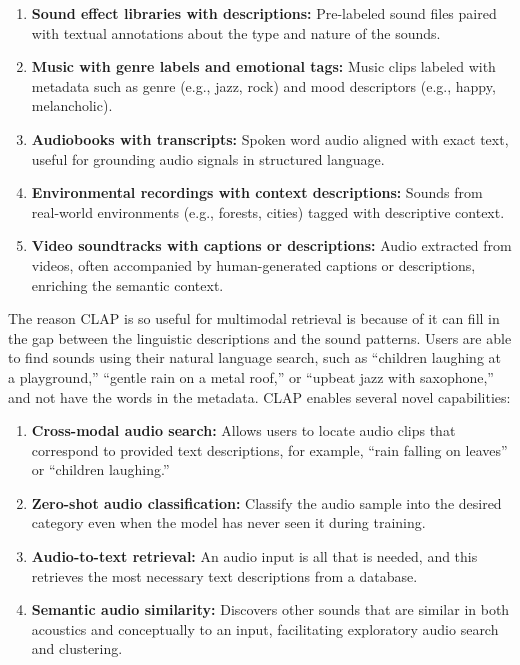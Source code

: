 \documentclass[conference]{IEEEtran}
\begin{document}
\begin{enumerate}
\begin{enumerate}
    \item \textbf{Sound effect libraries with descriptions:} Pre-labeled sound files paired with textual annotations about the type and nature of the sounds.
    
    \item \textbf{Music with genre labels and emotional tags:} Music clips labeled with metadata such as genre (e.g., jazz, rock) and mood descriptors (e.g., happy, melancholic).
    
    \item \textbf{Audiobooks with transcripts:} Spoken word audio aligned with exact text, useful for grounding audio signals in structured language.
    
    \item \textbf{Environmental recordings with context descriptions:} Sounds from real-world environments (e.g., forests, cities) tagged with descriptive context.
    
    \item \textbf{Video soundtracks with captions or descriptions:} Audio extracted from videos, often accompanied by human-generated captions or descriptions, enriching the semantic context.
\end{enumerate}

The reason CLAP is so useful for multimodal retrieval is because of it can fill in the gap between the linguistic descriptions and the sound patterns. Users are able to find sounds using their natural language search, such as “children laughing at a playground,” “gentle rain on a metal roof,” or “upbeat jazz with saxophone,” and not have the words in the metadata.
CLAP enables several novel capabilities:

\begin{enumerate}
\item \textbf{Cross-modal audio search:} Allows users to locate audio clips that correspond to provided text descriptions, for example, “rain falling on leaves” or “children laughing.”
\item \textbf{Zero-shot audio classification:} Classify the audio sample into the desired category even when the model has never seen it during training.
\item \textbf{Audio-to-text retrieval:} An audio input is all that is needed, and this retrieves the most necessary text descriptions from a database.
\item \textbf{Semantic audio similarity:} Discovers other sounds that are similar in both acoustics and conceptually to an input, facilitating exploratory audio search and clustering.
\end{enumerate}


\end{enumerate}
\end{document}
